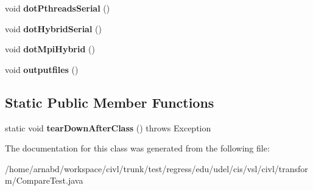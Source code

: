 \begin{DoxyCompactItemize}
\item 
\hypertarget{classedu_1_1udel_1_1cis_1_1vsl_1_1civl_1_1transform_1_1CompareTest_afb183d7150098f4e5c5e1e2fb8ed81c2}{}void {\bfseries dot\+Pthreads\+Serial} ()\label{classedu_1_1udel_1_1cis_1_1vsl_1_1civl_1_1transform_1_1CompareTest_afb183d7150098f4e5c5e1e2fb8ed81c2}

\item 
\hypertarget{classedu_1_1udel_1_1cis_1_1vsl_1_1civl_1_1transform_1_1CompareTest_a03cadee36449921be87860440db42998}{}void {\bfseries dot\+Hybrid\+Serial} ()\label{classedu_1_1udel_1_1cis_1_1vsl_1_1civl_1_1transform_1_1CompareTest_a03cadee36449921be87860440db42998}

\item 
\hypertarget{classedu_1_1udel_1_1cis_1_1vsl_1_1civl_1_1transform_1_1CompareTest_accb5f869bf1050765ad0fb1f05c9a0e5}{}void {\bfseries dot\+Mpi\+Hybrid} ()\label{classedu_1_1udel_1_1cis_1_1vsl_1_1civl_1_1transform_1_1CompareTest_accb5f869bf1050765ad0fb1f05c9a0e5}

\item 
\hypertarget{classedu_1_1udel_1_1cis_1_1vsl_1_1civl_1_1transform_1_1CompareTest_a7c2177ef5277d0aa83003ada159bcb2f}{}void {\bfseries outputfiles} ()\label{classedu_1_1udel_1_1cis_1_1vsl_1_1civl_1_1transform_1_1CompareTest_a7c2177ef5277d0aa83003ada159bcb2f}

\end{DoxyCompactItemize}
\subsection*{Static Public Member Functions}
\begin{DoxyCompactItemize}
\item 
\hypertarget{classedu_1_1udel_1_1cis_1_1vsl_1_1civl_1_1transform_1_1CompareTest_ad33421af32e822adbbed38698d9f9e5a}{}static void {\bfseries tear\+Down\+After\+Class} ()  throws Exception \label{classedu_1_1udel_1_1cis_1_1vsl_1_1civl_1_1transform_1_1CompareTest_ad33421af32e822adbbed38698d9f9e5a}

\end{DoxyCompactItemize}


The documentation for this class was generated from the following file\+:\begin{DoxyCompactItemize}
\item 
/home/arnabd/workspace/civl/trunk/test/regress/edu/udel/cis/vsl/civl/transform/Compare\+Test.\+java\end{DoxyCompactItemize}
